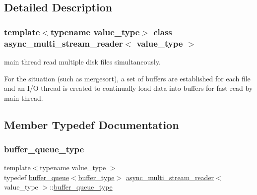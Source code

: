 \subsection{Detailed Description}
\subsubsection*{template$<$typename value\+\_\+type$>$\newline
class async\+\_\+multi\+\_\+stream\+\_\+reader$<$ value\+\_\+type $>$}

main thread read multiple disk files simultaneously. 

For the situation (such as mergesort), a set of buffers are established for each file and an I/O thread is created to continually load data into buffers for fast read by main thread. 

\subsection{Member Typedef Documentation}
\mbox{\label{classasync__multi__stream__reader_a0bf4b801f7d874da5cbbe5c6504d0ecc}} 
\subsubsection{\texorpdfstring{buffer\+\_\+queue\+\_\+type}{buffer\_queue\_type}}
{\footnotesize\ttfamily template$<$typename value\+\_\+type $>$ \\
typedef \hyperlink{structbuffer__queue}{buffer\+\_\+queue}$<$\hyperlink{classasync__multi__stream__reader_ad58ad834dc6d741a12be1fb442b8e5d6}{buffer\+\_\+type}$>$ \hyperlink{classasync__multi__stream__reader}{async\+\_\+multi\+\_\+stream\+\_\+reader}$<$ value\+\_\+type $>$\+::\hyperlink{classasync__multi__stream__reader_a0bf4b801f7d874da5cbbe5c6504d0ecc}{buffer\+\_\+queue\+\_\+type}\hspace{0.3cm}{\ttfamily [private]}}

\mbox{\label{classasync__multi__stream__reader_ad58ad834dc6d741a12be1fb442b8e5d6}} 
